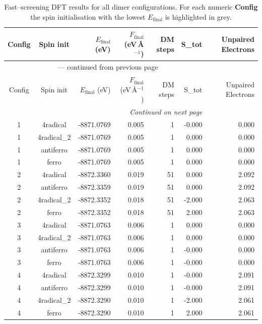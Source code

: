 
\begin{longtable}{@{}ccrrrrr@{}}
\caption{Fast–screening DFT results for all dimer configurations.
         For each numeric \textbf{Config} the spin initialisation with the
         lowest $E_{\mathrm{final}}$ is highlighted in grey.}\label{tab:dimer_full}\\
\toprule
Config & Spin init & $E_{\mathrm{final}}$ (eV) &
$F_{\mathrm{final}}$ (eV\,\AA$^{-1}$) & DM steps & S_{tot} & Unpaired Electrons\\
\midrule
\endfirsthead
\multicolumn{6}{c}{{\tablename}~\thetable{} — continued from previous page}\\
\toprule
Config & Spin init & $E_{\mathrm{final}}$ (eV) &
$F_{\mathrm{final}}$ (eV\,\AA$^{-1}$) & DM steps & S_{tot} & Unpaired Electrons\\
\midrule
\endhead
\midrule
\multicolumn{6}{r}{\emph{Continued on next page}}\\
\endfoot
\bottomrule
\endlastfoot
\rowcolor{gray!20} 1 & 4radical & -8871.0769 & 0.005 & 1 & -0.000 & 0.000 \\
1 & 4radical\_2 & -8871.0769 & 0.005 & 1 & 0.000 & 0.000 \\
1 & antiferro & -8871.0769 & 0.005 & 1 & 0.000 & 0.000 \\
1 & ferro & -8871.0769 & 0.005 & 1 & 0.000 & 0.000 \\
\rowcolor{gray!20} 2 & 4radical & -8872.3360 & 0.019 & 51 & 0.000 & 2.092 \\
2 & antiferro & -8872.3359 & 0.019 & 51 & 0.000 & 2.092 \\
2 & 4radical\_2 & -8872.3352 & 0.018 & 51 & -2.000 & 2.063 \\
2 & ferro & -8872.3352 & 0.018 & 51 & 2.000 & 2.063 \\
\rowcolor{gray!20} 3 & 4radical & -8871.0763 & 0.006 & 1 & 0.000 & 0.000 \\
3 & 4radical\_2 & -8871.0763 & 0.006 & 1 & 0.000 & 0.000 \\
3 & antiferro & -8871.0763 & 0.006 & 1 & -0.000 & 0.000 \\
3 & ferro & -8871.0763 & 0.006 & 1 & -0.000 & 0.000 \\
\rowcolor{gray!20} 4 & 4radical & -8872.3299 & 0.010 & 1 & -0.000 & 2.091 \\
4 & antiferro & -8872.3299 & 0.010 & 1 & -0.000 & 2.091 \\
4 & 4radical\_2 & -8872.3290 & 0.010 & 1 & -2.000 & 2.061 \\
4 & ferro & -8872.3290 & 0.010 & 1 & 2.000 & 2.061 \\
\end{longtable}
